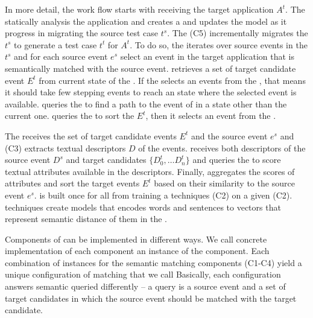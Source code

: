 \bigskip
In more detail, the \testreuse work flow starts with receiving the target application $A^t$.
The \generator statically analysis the application and creates a \tam and updates the model as it progress in migrating the source test case $t^s$.
The \selector (C5) incrementally migrates the $t^s$ to generate a test case $t^t$ for $A^t$.
To do so, the \selector iterates over source events in the $t^s$ and for each source event $e^s$ select an event in the target application that is semantically matched with the source event.
\selector retrieves a set of target candidate event $E^t$ from current state of the \tam. 
If the \selector selects an events from the \tam, that means it should take few stepping events to reach an state where the selected event is available. 
\selector queries the \tam to find a path to the event of in a state other than the current one. 
\selector queries the \matcher to  sort the $E^t$, then it selects an event from the . 

\bigskip
The \matcher receives the set of target  candidate events $E^t$ and the source event $e^s$ and \ede (C3) extracts textual descriptors $D$ of the events. 
\sma receives both descriptors of the source event $D^s$ and target candidates $\{D_0^t, \dots D_n^t\}$ and queries the \wem to score textual attributes available in the descriptors. 
Finally, \sme aggregates the scores of attributes and sort the target events $E^t$ based on their similarity to the  source event $e^s$.
\wem is built once for all from training a \we techniques (C2) on a given \corpus (C2). 
\we techniques create models that encodes words and sentences to vectors that represent semantic distance of them in the \corpus.


\bigskip
Components of \testreuse can be implemented in different ways.
We call concrete implementation of each component an instance of the component.
Each combination of instances for the semantic matching components (C1-C4) yield a unique configuration of matching that we call \smconfig
Basically, each configuration answers semantic queried differently --  a query is a source event  and a set of target candidates in which the source event should be matched with the target candidate. 


